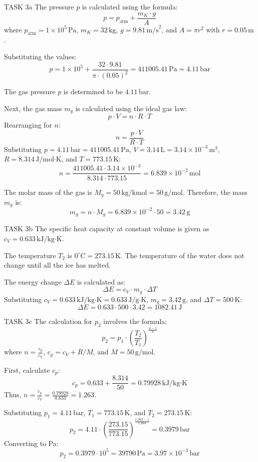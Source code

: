 TASK 3a  
The pressure \( p \) is calculated using the formula:  
\[
p = p_{\text{atm}} + \frac{m_K \cdot g}{A}
\]  
where \( p_{\text{atm}} = 1 \times 10^5 \, \text{Pa} \), \( m_K = 32 \, \text{kg} \), \( g = 9.81 \, \text{m/s}^2 \), and \( A = \pi r^2 \) with \( r = 0.05 \, \text{m} \).  

Substituting the values:  
\[
p = 1 \times 10^5 + \frac{32 \cdot 9.81}{\pi \cdot (0.05)^2} = 411005.41 \, \text{Pa} = 4.11 \, \text{bar}
\]  

The gas pressure \( p \) is determined to be \( 4.11 \, \text{bar} \).  

Next, the gas mass \( m_g \) is calculated using the ideal gas law:  
\[
p \cdot V = n \cdot R \cdot T
\]  
Rearranging for \( n \):  
\[
n = \frac{p \cdot V}{R \cdot T}
\]  
Substituting \( p = 4.11 \, \text{bar} = 411005.41 \, \text{Pa} \), \( V = 3.14 \, \text{L} = 3.14 \times 10^{-3} \, \text{m}^3 \), \( R = 8.314 \, \text{J/mol·K} \), and \( T = 773.15 \, \text{K} \):  
\[
n = \frac{411005.41 \cdot 3.14 \times 10^{-3}}{8.314 \cdot 773.15} = 6.839 \times 10^{-2} \, \text{mol}
\]  

The molar mass of the gas is \( M_g = 50 \, \text{kg/kmol} = 50 \, \text{g/mol} \). Therefore, the mass \( m_g \) is:  
\[
m_g = n \cdot M_g = 6.839 \times 10^{-2} \cdot 50 = 3.42 \, \text{g}
\]  

TASK 3b  
The specific heat capacity at constant volume is given as \( c_V = 0.633 \, \text{kJ/kg·K} \).  

The temperature \( T_2 \) is \( 0^\circ\text{C} = 273.15 \, \text{K} \). The temperature of the water does not change until all the ice has melted.  

The energy change \( \Delta E \) is calculated as:  
\[
\Delta E = c_V \cdot m_g \cdot \Delta T
\]  
Substituting \( c_V = 0.633 \, \text{kJ/kg·K} = 0.633 \, \text{J/g·K} \), \( m_g = 3.42 \, \text{g} \), and \( \Delta T = 500 \, \text{K} \):  
\[
\Delta E = 0.633 \cdot 500 \cdot 3.42 = 1082.41 \, \text{J}
\]  

TASK 3c  
The calculation for \( p_2 \) involves the formula:  
\[
p_2 = p_1 \cdot \left( \frac{T_2}{T_1} \right)^{\frac{n-1}{n}}
\]  
where \( n = \frac{c_p}{c_V} \), \( c_p = c_V + R/M \), and \( M = 50 \, \text{g/mol} \).  

First, calculate \( c_p \):  
\[
c_p = 0.633 + \frac{8.314}{50} = 0.79928 \, \text{kJ/kg·K}
\]  
Thus, \( n = \frac{c_p}{c_V} = \frac{0.79928}{0.633} = 1.263 \).  

Substituting \( p_1 = 4.11 \, \text{bar} \), \( T_1 = 773.15 \, \text{K} \), and \( T_2 = 273.15 \, \text{K} \):  
\[
p_2 = 4.11 \cdot \left( \frac{273.15}{773.15} \right)^{\frac{1.263-1}{1.263}} = 0.3979 \, \text{bar}
\]  
Converting to Pa:  
\[
p_2 = 0.3979 \cdot 10^5 = 39790 \, \text{Pa} = 3.97 \times 10^{-3} \, \text{bar}
\]